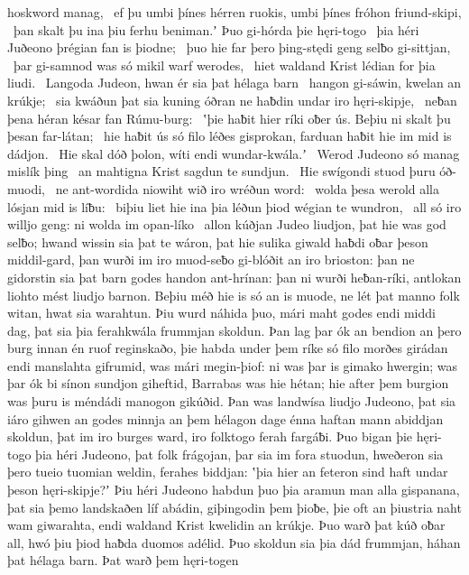 hoskword manag, \hld\ ef þu umbi þínes hérren ruokis,
umbi þínes fróhon friund-skipi, \hld\ þan skalt þu ina þiu ferhu beniman.ʼ
Þuo gi-hórda þie hęri-togo \hld\ þia héri Juðeono
þrégian fan is þiodne; \hld\ þuo hie far þero þing-stędi geng
selƀo gi-sittjan, \hld\ þar gi-samnod was
só mikil warf werodes, \hld\ hiet waldand Krist
lédian for þia liudi. \hld\ Langoda Judeon,
hwan ér sia þat hélaga barn \hld\ hangon gi-sáwin,
kwelan an krúkje; \hld\ sia kwáðun þat sia kuning óðran
ne haƀdin undar iro hęri-skipje, \hld\ neƀan þena héran késar
fan Rúmu-burg: \hld\ ʽþie haƀit hier ríki oƀer ús.
Beþiu ni skalt þu þesan far-látan; \hld\ hie haƀit ús só filo léðes gisprokan,
farduan haƀit hie im mid is dádjon. \hld\ Hie skal dóð þolon,
wíti endi wundar-kwála.ʼ \hld\ Werod Judeono
só manag mislík þing \hld\ an mahtigna Krist
sagdun te sundjun. \hld\ Hie swígondi stuod
þuru óð-muodi, \hld\ ne ant-wordida niowiht
wið iro wréðun word: \hld\ wolda þesa werold alla
lósjan mid is líƀu: \hld\ biþiu liet hie ina þia léðun þiod
wégian te wundron, \hld\ all só iro willjo geng:
ni wolda im opan-líko \hld\ allon kúðjan
Judeo liudjon, þat hie was god selƀo;
hwand wissin sia þat te wáron, þat hie sulika giwald haƀdi
oƀar þeson middil-gard, þan wurði im iro muod-seƀo
gi-blóðit an iro brioston: þan ne gidorstin sia þat barn godes
handon ant-hrínan: þan ni wurði heƀan-ríki,
antlokan liohto mést liudjo barnon.
Beþiu méð hie is só an is muode, ne lét þat manno folk
witan, hwat sia warahtun. Þiu wurd náhida þuo,
mári maht godes endi middi dag,
þat sia þia ferahkwála frummjan skoldun.
Þan lag þar ók an bendion an þero burg innan
én ruof reginskaðo, þie habda under þem ríke só filo
morðes girádan endi manslahta gifrumid,
was mári megin-þiof: ni was þar is gimako hwergin;
was þar ók bi sínon sundjon giheftid,
Barrabas was hie hétan; hie after þem burgion was
þuru is méndádi manogon gikúðid.
Þan was landwísa liudjo Judeono,
þat sia iáro gihwen an godes minnja
an þem hélagon dage énna haftan mann
abiddjan skoldun, þat im iro burges ward,
iro folktogo ferah fargáƀi.
Þuo bigan þie hęri-togo þia héri Judeono,
þat folk frágojan, þar sia im fora stuodun,
hweðeron sia þero tueio tuomian weldin,
ferahes biddjan: ʽþia hier an feteron sind
haft undar þeson hęri-skipje?ʼ Þiu héri Judeono
habdun þuo þia aramun man alla gispanana,
þat sia þemo landskaðen líf abádin,
giþingodin þem þioƀe, þie oft an þiustria naht
wam giwarahta, endi waldand Krist
kwelidin an krúkje. Þuo warð þat kúð oƀar all,
hwó þiu þiod haƀda duomos adélid. Þuo skoldun sia þia dád frummjan,
háhan þat hélaga barn. Þat warð þem hęri-togen
